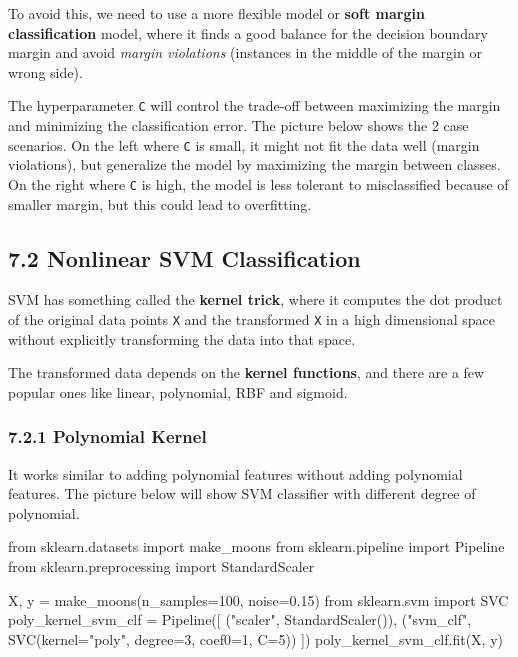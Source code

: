 \documentclass[
  letterpaper,
  DIV=11,
  numbers=noendperiod]{scrartcl}
\newenvironment{Shaded}{\begin{snugshade}}{\end{snugshade}}
\newcommand{\DecValTok}[1]{\textcolor[rgb]{0.68,0.00,0.00}{#1}}
\newcommand{\FloatTok}[1]{\textcolor[rgb]{0.68,0.00,0.00}{#1}}
\newcommand{\ImportTok}[1]{\textcolor[rgb]{0.00,0.46,0.62}{#1}}
\newcommand{\NormalTok}[1]{\textcolor[rgb]{0.00,0.23,0.31}{#1}}
\newcommand{\OperatorTok}[1]{\textcolor[rgb]{0.37,0.37,0.37}{#1}}
\newcommand{\StringTok}[1]{\textcolor[rgb]{0.13,0.47,0.30}{#1}}
\begin{document}
To avoid this, we need to use a more flexible model or \textbf{soft
margin classification} model, where it finds a good balance for the
decision boundary margin and avoid \emph{margin violations} (instances
in the middle of the margin or wrong side).

The hyperparameter \texttt{C} will control the trade-off between
maximizing the margin and minimizing the classification error. The
picture below shows the 2 case scenarios. On the left where \texttt{C}
is small, it might not fit the data well (margin violations), but
generalize the model by maximizing the margin between classes. On the
right where \texttt{C} is high, the model is less tolerant to
misclassified because of smaller margin, but this could lead to
overfitting.

\subsection{7.2 Nonlinear SVM
Classification}\label{nonlinear-svm-classification}

SVM has something called the \textbf{kernel trick}, where it computes
the dot product of the original data points \texttt{X} and the
transformed \texttt{X\textquotesingle{}} in a high dimensional space
without explicitly transforming the data into that space.

The transformed data depends on the \textbf{kernel functions}, and there
are a few popular ones like linear, polynomial, RBF and sigmoid.

\subsubsection{7.2.1 Polynomial Kernel}\label{polynomial-kernel}

It works similar to adding polynomial features without adding polynomial
features. The picture below will show SVM classifier with different
degree of polynomial.

\begin{Shaded}
\begin{Highlighting}[]
\ImportTok{from}\NormalTok{ sklearn.datasets }\ImportTok{import}\NormalTok{ make\_moons}
\ImportTok{from}\NormalTok{ sklearn.pipeline }\ImportTok{import}\NormalTok{ Pipeline}
\ImportTok{from}\NormalTok{ sklearn.preprocessing }\ImportTok{import}\NormalTok{ StandardScaler}

\NormalTok{X, y }\OperatorTok{=}\NormalTok{ make\_moons(n\_samples}\OperatorTok{=}\DecValTok{100}\NormalTok{, noise}\OperatorTok{=}\FloatTok{0.15}\NormalTok{)}
\ImportTok{from}\NormalTok{ sklearn.svm }\ImportTok{import}\NormalTok{ SVC}
\NormalTok{poly\_kernel\_svm\_clf }\OperatorTok{=}\NormalTok{ Pipeline([}
\NormalTok{        (}\StringTok{"scaler"}\NormalTok{, StandardScaler()),}
\NormalTok{        (}\StringTok{"svm\_clf"}\NormalTok{, SVC(kernel}\OperatorTok{=}\StringTok{"poly"}\NormalTok{, degree}\OperatorTok{=}\DecValTok{3}\NormalTok{, coef0}\OperatorTok{=}\DecValTok{1}\NormalTok{, C}\OperatorTok{=}\DecValTok{5}\NormalTok{))}
\NormalTok{    ])}
\NormalTok{poly\_kernel\_svm\_clf.fit(X, y)}
\end{Highlighting}
\end{Shaded}
\end{document}
